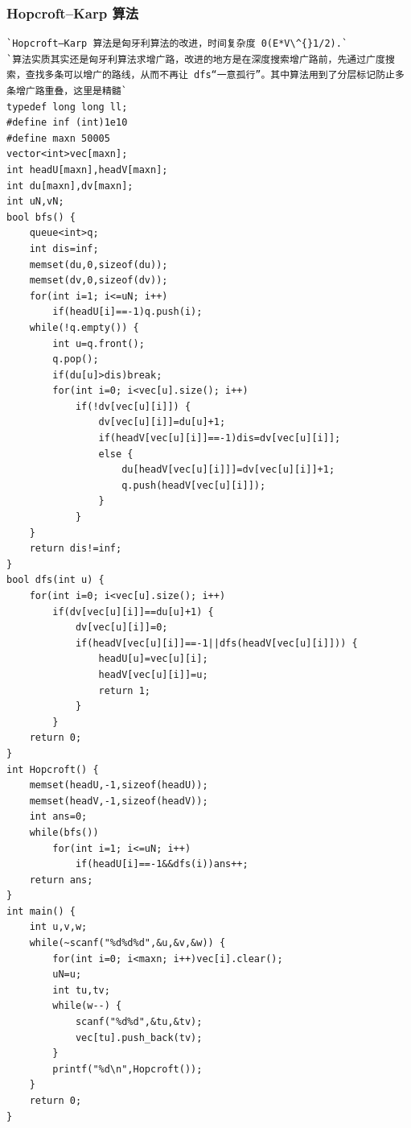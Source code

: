 \documentclass[a4paper]{article}
\begin{document}
\begin{CJK*}{UTF8}{gbsn}
\begin{multicols}{3}
\begin{flushleft}
\subsubsection{Hopcroft–Karp 算法}
\begin{lstlisting}
`Hopcroft–Karp 算法是匈牙利算法的改进，时间复杂度 0(E*V\^{}1/2).`
`算法实质其实还是匈牙利算法求增广路，改进的地方是在深度搜索增广路前，先通过广度搜索，查找多条可以增广的路线，从而不再让 dfs“一意孤行”。其中算法用到了分层标记防止多条增广路重叠，这里是精髓`
typedef long long ll;
#define inf (int)1e10
#define maxn 50005
vector<int>vec[maxn];
int headU[maxn],headV[maxn];
int du[maxn],dv[maxn];
int uN,vN;
bool bfs() {
    queue<int>q;
    int dis=inf;
    memset(du,0,sizeof(du));
    memset(dv,0,sizeof(dv));
    for(int i=1; i<=uN; i++)
        if(headU[i]==-1)q.push(i);
    while(!q.empty()) {
        int u=q.front();
        q.pop();
        if(du[u]>dis)break;
        for(int i=0; i<vec[u].size(); i++)
            if(!dv[vec[u][i]]) {
                dv[vec[u][i]]=du[u]+1;
                if(headV[vec[u][i]]==-1)dis=dv[vec[u][i]];
                else {
                    du[headV[vec[u][i]]]=dv[vec[u][i]]+1;
                    q.push(headV[vec[u][i]]);
                }
            }
    }
    return dis!=inf;
}
bool dfs(int u) {
    for(int i=0; i<vec[u].size(); i++)
        if(dv[vec[u][i]]==du[u]+1) {
            dv[vec[u][i]]=0;
            if(headV[vec[u][i]]==-1||dfs(headV[vec[u][i]])) {
                headU[u]=vec[u][i];
                headV[vec[u][i]]=u;
                return 1;
            }
        }
    return 0;
}
int Hopcroft() {
    memset(headU,-1,sizeof(headU));
    memset(headV,-1,sizeof(headV));
    int ans=0;
    while(bfs())
        for(int i=1; i<=uN; i++)
            if(headU[i]==-1&&dfs(i))ans++;
    return ans;
}
int main() {
    int u,v,w;
    while(~scanf("%d%d%d",&u,&v,&w)) {
        for(int i=0; i<maxn; i++)vec[i].clear();
        uN=u;
        int tu,tv;
        while(w--) {
            scanf("%d%d",&tu,&tv);
            vec[tu].push_back(tv);
        }
        printf("%d\n",Hopcroft());
    }
    return 0;
}
\end{lstlisting}


\end{flushleft}
\end{multicols}
\end{CJK*}
\end{document}
